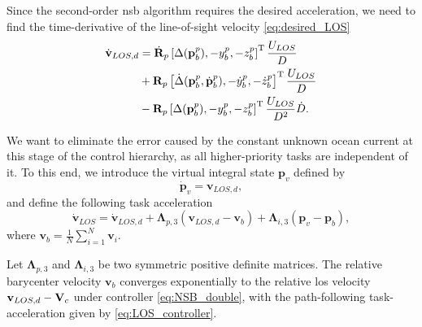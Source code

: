 Since the second-order \gls{nsb} algorithm requires the desired acceleration, we need to find the time-derivative of the line-of-sight velocity \eqref{eq:desired_LOS}
\begin{equation}\label{eq:desired_LOS_derivative}
\begin{split}
        \dot{\mathbf{v}}_{LOS,d} &= \dot{\mathbf{R}}_p\left[ \Delta(\mathbf{p}_b^p), -y_b^p, -z_b^p \right]^{\mathrm{T}} \frac{U_{LOS}}{D} \\&+ \mathbf{R}_p \left[ \dot{\Delta}(\mathbf{p}_b^p, \dot{\mathbf{p}}_b^p), -\dot{y}_b^p, -\dot{z}_b^p \right]^{\mathrm{T}} \frac{U_{LOS}}{D}\\ &- \mathbf{R}_p \left[ \Delta(\mathbf{p}_b^p), -y_b^p, -z_b^p \right]^{\mathrm{T}} \frac{U_{LOS}}{D^2}\dot{D}.
    \end{split}
\end{equation}

We want to eliminate the error caused by the constant unknown ocean current at this stage of the control hierarchy, as all higher-priority tasks are independent of it. To this end, we introduce the virtual integral state $\mathbf{p}_v$ defined by
\begin{equation}\label{eq:los_integral_state}
    \dot{\mathbf{p}}_v = \mathbf{v}_{LOS,d},
\end{equation}
and define the following task acceleration
\begin{equation} \label{eq:LOS_controller}
    \dot{\mathbf{v}}_{LOS} = \dot{\mathbf{v}}_{LOS,d} + \mathbf{\Lambda}_{p,3} (\mathbf{v}_{LOS,d} - \mathbf{v}_b) + \mathbf{\Lambda}_{i,3} (\mathbf{p}_v-\mathbf{p}_b),
\end{equation}
where $\mathbf{v}_b = \tfrac{1}{N} \sum_{i=1}^N \mathbf{v}_i$.

\begin{lemma}\label{lemma:LOS_controller}
    Let $\bm{\Lambda}_{p,3}$ and $\bm{\Lambda}_{i,3}$ be two symmetric positive definite matrices. The relative barycenter velocity $\mathbf{v}_b$ converges exponentially to the relative \gls{los} velocity $\mathbf{v}_{LOS,d}-\mathbf{V}_c$ under controller \eqref{eq:NSB_double}, with the path-following task-acceleration given by \eqref{eq:LOS_controller}.
\end{lemma}

